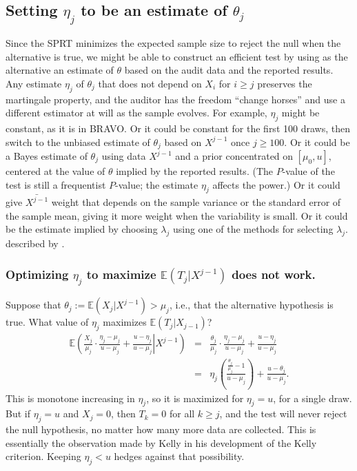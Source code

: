 \documentclass[12pt,runningheads]{llncs}
\newcommand{\EE}{\mathbb{E}}
\begin{document}
{\subsection{Setting $\eta_j$ to be an estimate of $\theta_j$}
Since the SPRT minimizes the expected sample size to reject the null when the alternative is true,
we might be able to construct an efficient test by using as the alternative an estimate of $\theta$
based on the audit data and the reported results.
Any estimate $\eta_j$ of $\theta_j$ that does not depend on $X_i$ for $i \ge j$ preserves the martingale property, 
and the auditor has the freedom ``change horses'' and use a different estimator
at will as the sample evolves. 
For example, $\eta_j$ might be constant, as it is in BRAVO.
Or it could be constant for the first 100 draws, then switch to the unbiased estimate of $\theta_j$ 
based on $X^{j-1}$ once $j \ge 100$.
Or it could be a Bayes estimate of $\theta_j$ using data $X^{j-1}$ and a prior concentrated on
$[\mu_0, u]$, centered at the value of $\theta$ implied by the reported results.
(The $P$-value of the test is still a frequentist $P$-value; the estimate $\eta_j$ affects the power.)
Or it could give $\bar{X^{j-1}}$ weight that depends on the sample variance or the standard error of the sample mean, 
giving it more weight when the variability is small.
Or it could be the estimate implied by choosing $\lambda_j$ using one of the methods for selecting $\lambda_j$.
described by \cite{waudby-smithRamdas21}.

\subsubsection{Optimizing $\eta_j$ to maximize $\EE (T_j| X^{j-1})$ does not work.}
Suppose that $\theta_j := \EE (X_j | X^{j-1}) > \mu_j$, i.e., that the alternative hypothesis is true. 
What value of $\eta_j$ maximizes $\EE (T_j | X_{j-1})$?
\begin{eqnarray}
\EE \left ( \left . \frac{X_j}{\mu_j} \cdot \frac{\eta_j-\mu_j}{u-\mu_j} + \frac{u-\eta_j}{u-\mu_j} \right | X^{j-1} \right ) &=&
\frac{\theta_j}{\mu_j} \cdot \frac{\eta_j-\mu_j}{u-\mu_j} + \frac{u-\eta_j}{u-\mu_j} \nonumber \\
&=& \eta_j \left ( \frac{\frac{\theta_j}{\mu_j} - 1}{u-\mu_j} \right ) + \frac{u-\theta_j}{u-\mu_j}.
\end{eqnarray}
This is monotone increasing in $\eta_j$, so it is maximized for $\eta_j = u$, for a single draw.
But if $\eta_j=u$ and $X_j = 0$, then $T_k = 0$ for all $k \ge j$, and the test will never reject the null
hypothesis, no matter how many more data are collected.
This is essentially the observation made by Kelly \cite{kelly56} in his development of the
Kelly criterion.
Keeping $\eta_j < u$ hedges against that possibility.

}
\end{document}
